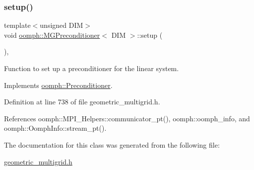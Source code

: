\subsubsection{\texorpdfstring{setup()}{setup()}}
{\footnotesize\ttfamily template$<$unsigned D\+IM$>$ \\
void \hyperlink{classoomph_1_1MGPreconditioner}{oomph\+::\+M\+G\+Preconditioner}$<$ D\+IM $>$\+::setup (\begin{DoxyParamCaption}{ }\end{DoxyParamCaption})\hspace{0.3cm}{\ttfamily [inline]}, {\ttfamily [virtual]}}



Function to set up a preconditioner for the linear system. 



Implements \hyperlink{classoomph_1_1Preconditioner_af4886f4efe510e5c9b0eb19422943588}{oomph\+::\+Preconditioner}.



Definition at line 738 of file geometric\+\_\+multigrid.\+h.



References oomph\+::\+M\+P\+I\+\_\+\+Helpers\+::communicator\+\_\+pt(), oomph\+::oomph\+\_\+info, and oomph\+::\+Oomph\+Info\+::stream\+\_\+pt().



The documentation for this class was generated from the following file\+:\begin{DoxyCompactItemize}
\item 
\hyperlink{geometric__multigrid_8h}{geometric\+\_\+multigrid.\+h}\end{DoxyCompactItemize}
